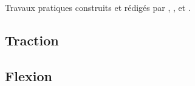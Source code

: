 \documentclass[lecture.tex]{subfiles}
\begin{document}
Travaux pratiques construits et rédigés par \fabien, \julien, \najat et \rolandH.

\subsection{Traction}




\subsection{Flexion}



\end{document}
